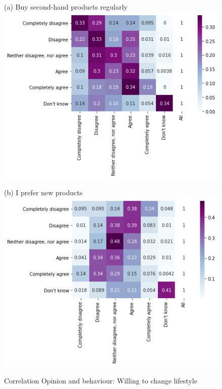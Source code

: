 \documentclass[12pt]{article}
\begin{document}
\begin{figure}[h!!]
	\centering	
	\caption{Correlation Opinion and behaviour: Willing to change lifestyle}\label{fig:behaviour_opinion}	
	\begin{minipage}[h!!]{0.32\textwidth}  
		\centering\footnotesize{(a) Buy second-hand products regularly}
		\includegraphics[width=1\textwidth]{../codding_data/results/liss/conditional_heatmap175_135labels0.png}
	\end{minipage}
	\begin{minipage}[h!!]{0.32\textwidth}
		\centering\footnotesize{(b) I prefer new products}
		\includegraphics[width=1\textwidth]{../codding_data/results/liss/conditional_heatmap175_148labels0.png}

\end{minipage}
\end{figure}
\end{document}
